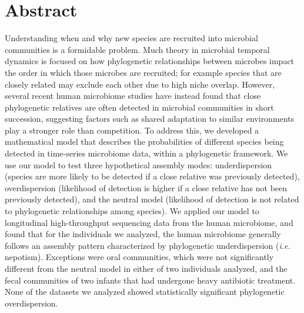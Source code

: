 \documentclass{article}
\begin{document}
\newpage


{\parindent0pt \section{Abstract}}
Understanding when and why new species are recruited into microbial communities is a formidable problem. Much theory in microbial temporal dynamics is focused on how phylogenetic relationships between microbes impact the order in which those microbes are recruited; for example species that are closely related may exclude each other due to high niche overlap. However, several recent human microbiome studies have instead found that close phylogenetic relatives are often detected in microbial communities in short succession, suggesting factors such as shared adaptation to similar environments play a stronger role than competition. To address this, we developed a mathematical model that describes the probabilities of different species being detected in time-series microbiome data, within a phylogenetic framework. We use our model to test three hypothetical assembly modes: underdispersion (species are more likely to be detected if a close relative was previously detected), overdispersion (likelihood of detection is higher if a close relative has not been previously detected), and the neutral model (likelihood of detection is not related to phylogenetic relationships among species). We applied our model to longitudinal high-throughput sequencing data from the human microbiome, and found that for the individuals we analyzed, the human microbiome generally follows an assembly pattern characterized by phylogenetic underdispersion (\emph{i.e.} nepotism). Exceptions were oral communities, which were not significantly different from the neutral model in either of two individuals analyzed, and the fecal communities of two infants that had undergone heavy antibiotic treatment. None of the datasets we analyzed showed statistically significant phylogenetic overdispersion.
\\\par
\end{document}

